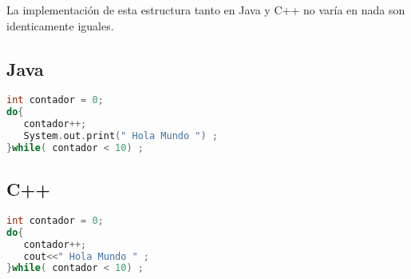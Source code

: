 La implementación de esta estructura tanto en Java y C++ no varía en nada son identicamente iguales. 

\subsection{Java}
\begin{lstlisting}[language=C++]
int contador = 0;
do{
   contador++;
   System.out.print(" Hola Mundo ") ;
}while( contador < 10) ;
\end{lstlisting}


\subsection{C++}
\begin{lstlisting}[language=C++]
int contador = 0;
do{
   contador++;
   cout<<" Hola Mundo " ;
}while( contador < 10) ;
\end{lstlisting}